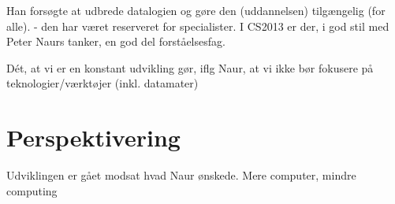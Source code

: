 Han forsøgte at udbrede datalogien og gøre den (uddannelsen) tilgængelig (for alle).
 - den har været reserveret for specialister.
I CS2013 er der, i god stil med Peter Naurs tanker, en god del forståelsesfag.

Dét, at vi er en konstant udvikling gør, iflg Naur, at vi ikke bør fokusere på teknologier/værktøjer (inkl. datamater)

\section{Perspektivering}
Udviklingen er gået modsat hvad Naur ønskede. Mere computer, mindre computing

